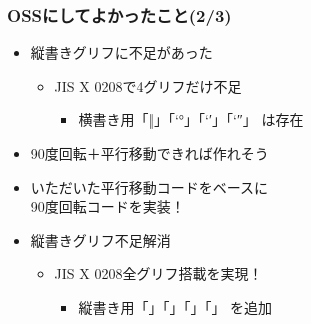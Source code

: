 \begin{frame}\frametitle{OSSにしてよかったこと(2/3)}
  \begin{itemize}
  \item 縦書きグリフに不足があった
    \begin{itemize}
    \item JIS X 0208で4グリフだけ不足
      \begin{itemize}
      \item 横書き用「‖」「\ltjjachar`°」「\ltjjachar`′」「\ltjjachar`″」
        は存在
      \end{itemize}
    \end{itemize}
  \item 90度回転＋平行移動できれば作れそう
  \item いただいた平行移動コードをベースに \\ 90度回転コードを実装！
  \item 縦書きグリフ不足解消
    \begin{itemize}
    \item JIS X 0208全グリフ搭載を実現！
      \begin{itemize}
      \item 縦書き用「」「」「」「」
        を追加
      \end{itemize}
    \end{itemize}
  \end{itemize}
\end{frame}

